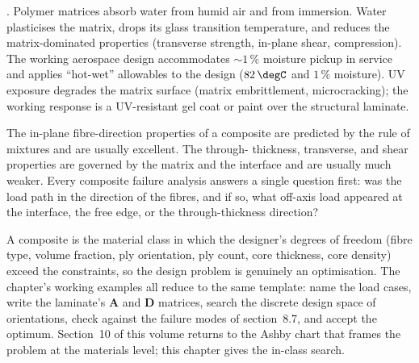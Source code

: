 . Polymer matrices absorb water
from humid air and from immersion. Water plasticises the matrix, drops
its glass transition temperature, and reduces the matrix-dominated
properties (transverse strength, in-plane shear, compression). The
working aerospace design accommodates $\sim 1\,\%$ moisture pickup in
service and applies ``hot-wet'' allowables to the design ($82\,\degC$
and $1\,\%$ moisture). UV exposure degrades the matrix surface (matrix
embrittlement, microcracking); the working response is a UV-resistant
gel coat or paint over the structural laminate.

\begin{principle}
The in-plane fibre-direction properties of a composite are predicted
by the rule of mixtures and are usually excellent. The through-
thickness, transverse, and shear properties are governed by the
matrix and the interface and are usually much weaker. Every composite
failure analysis answers a single question first: was the load path
in the direction of the fibres, and if so, what off-axis load
appeared at the interface, the free edge, or the through-thickness
direction?
\end{principle}

\begin{archetype}
A composite is the material class in which the designer's degrees of
freedom (fibre type, volume fraction, ply orientation, ply count,
core thickness, core density) exceed the constraints, so the design
problem is genuinely an optimisation. The chapter's working examples
all reduce to the same template: name the load cases, write the
laminate's $\mathbf{A}$ and $\mathbf{D}$ matrices, search the
discrete design space of orientations, check against the failure modes
of section~8.7, and accept the optimum. Section~10 of this volume
returns to the Ashby chart that frames the problem at the materials
level; this chapter gives the in-class search.
\end{archetype}

